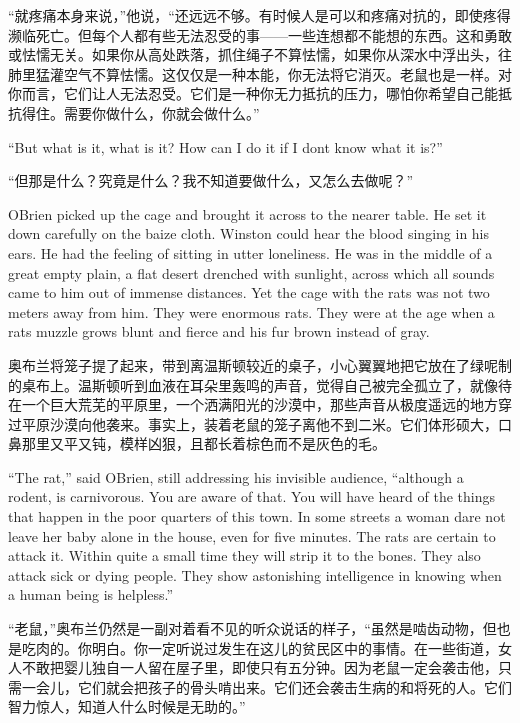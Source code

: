 \begin{paracol}{2}
``就疼痛本身来说，''他说，``还远远不够。有时候人是可以和疼痛对抗的，即使疼得濒临死亡。但每个人都有些无法忍受的事——一些连想都不能想的东西。这和勇敢或怯懦无关。如果你从高处跌落，抓住绳子不算怯懦，如果你从深水中浮出头，往肺里猛灌空气不算怯懦。这仅仅是一种本能，你无法将它消灭。老鼠也是一样。对你而言，它们让人无法忍受。它们是一种你无力抵抗的压力，哪怕你希望自己能抵抗得住。需要你做什么，你就会做什么。''

\switchcolumn*

``But what is it, what is it? How can I do it if I don\textquotesingle t
know what it is?''

\switchcolumn

``但那是什么？究竟是什么？我不知道要做什么，又怎么去做呢？''

\switchcolumn*

O\textquotesingle Brien picked up the cage and brought it across to the
nearer table. He set it down carefully on the baize cloth. Winston could
hear the blood singing in his ears. He had the feeling of sitting in
utter loneliness. He was in the middle of a great empty plain, a flat
desert drenched with sunlight, across which all sounds came to him out
of immense distances. Yet the cage with the rats was not two meters away
from him. They were enormous rats. They were at the age when a
rat\textquotesingle s muzzle grows blunt and fierce and his fur brown
instead of gray.

\switchcolumn

奥布兰将笼子提了起来，带到离温斯顿较近的桌子，小心翼翼地把它放在了绿呢制的桌布上。温斯顿听到血液在耳朵里轰鸣的声音，觉得自己被完全孤立了，就像待在一个巨大荒芜的平原里，一个洒满阳光的沙漠中，那些声音从极度遥远的地方穿过平原沙漠向他袭来。事实上，装着老鼠的笼子离他不到二米。它们体形硕大，口鼻那里又平又钝，模样凶狠，且都长着棕色而不是灰色的毛。

\switchcolumn*

``The rat,'' said O\textquotesingle Brien, still addressing his invisible
audience, ``although a rodent, is carnivorous. You are aware of that. You
will have heard of the things that happen in the poor quarters of this
town. In some streets a woman dare not leave her baby alone in the
house, even for five minutes. The rats are certain to attack it. Within
quite a small time they will strip it to the bones. They also attack
sick or dying people. They show astonishing intelligence in knowing when
a human being is helpless.''

\switchcolumn

``老鼠，''奥布兰仍然是一副对着看不见的听众说话的样子，``虽然是啮齿动物，但也是吃肉的。你明白。你一定听说过发生在这儿的贫民区中的事情。在一些街道，女人不敢把婴儿独自一人留在屋子里，即使只有五分钟。因为老鼠一定会袭击他，只需一会儿，它们就会把孩子的骨头啃出来。它们还会袭击生病的和将死的人。它们智力惊人，知道人什么时候是无助的。''


\end{paracol}
